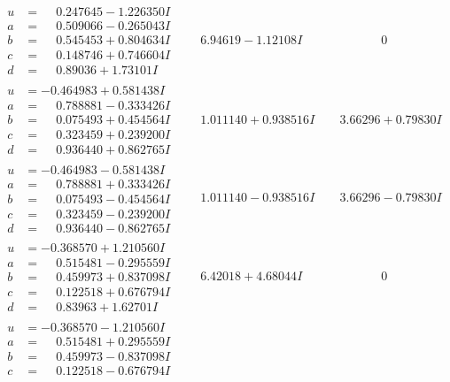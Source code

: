 \documentclass[1p]{elsarticle_modified}
\theoremstyle{definition}
\begin{document}
$$\begin{array}{c|c|c}
\begin{aligned}
u &= \phantom{-}0.247645 - 1.226350 I \\
a &= \phantom{-}0.509066 - 0.265043 I \\
b &= \phantom{-}0.545453 + 0.804634 I \\
c &= \phantom{-}0.148746 + 0.746604 I \\
d &= \phantom{-}0.89036 + 1.73101 I\end{aligned}
 & \phantom{-}6.94619 - 1.12108 I & \phantom{-0.000000 } 0 \\ \hline\begin{aligned}
u &= -0.464983 + 0.581438 I \\
a &= \phantom{-}0.788881 - 0.333426 I \\
b &= \phantom{-}0.075493 + 0.454564 I \\
c &= \phantom{-}0.323459 + 0.239200 I \\
d &= \phantom{-}0.936440 + 0.862765 I\end{aligned}
 & \phantom{-}1.011140 + 0.938516 I & \phantom{-}3.66296 + 0.79830 I \\ \hline\begin{aligned}
u &= -0.464983 - 0.581438 I \\
a &= \phantom{-}0.788881 + 0.333426 I \\
b &= \phantom{-}0.075493 - 0.454564 I \\
c &= \phantom{-}0.323459 - 0.239200 I \\
d &= \phantom{-}0.936440 - 0.862765 I\end{aligned}
 & \phantom{-}1.011140 - 0.938516 I & \phantom{-}3.66296 - 0.79830 I \\ \hline\begin{aligned}
u &= -0.368570 + 1.210560 I \\
a &= \phantom{-}0.515481 - 0.295559 I \\
b &= \phantom{-}0.459973 + 0.837098 I \\
c &= \phantom{-}0.122518 + 0.676794 I \\
d &= \phantom{-}0.83963 + 1.62701 I\end{aligned}
 & \phantom{-}6.42018 + 4.68044 I & \phantom{-0.000000 } 0 \\ \hline\begin{aligned}
u &= -0.368570 - 1.210560 I \\
a &= \phantom{-}0.515481 + 0.295559 I \\
b &= \phantom{-}0.459973 - 0.837098 I \\
c &= \phantom{-}0.122518 - 0.676794 I \\

\end{aligned}
\end{array}$$
\end{document}
